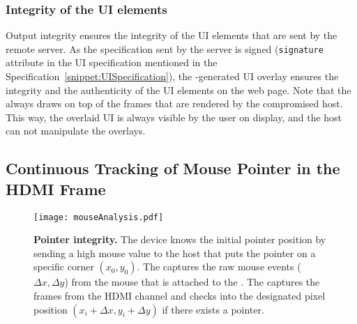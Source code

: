\subsubsection{\bfseries Integrity of the UI elements} Output integrity ensures the integrity of the UI elements that are sent by the remote server. As the specification sent by the server is signed (\texttt{signature} attribute in the UI specification mentioned in the Specification~\ref{snippet:UISpecification}), the \device-generated UI overlay ensures the integrity and the authenticity of the UI elements on the web page. Note that the \device always draws on top of the frames that are rendered by the compromised host. This way, the overlaid UI is always visible by the user on display, and the host can not manipulate the overlays.



\subsection{Continuous Tracking of Mouse Pointer in the HDMI Frame}
\label{sec:systemDesign:analysis}


\begin{figure}[t]
\centering
\texttt{[image: mouseAnalysis.pdf]}
\caption{\textbf{Pointer integrity.} The device knows the initial pointer position by sending a high mouse value to the host that puts the pointer on a specific corner $(x_0, y_0)$. \one The \device captures the raw mouse events ($\Delta x, \Delta y$) from the mouse that is attached to the \device. \two The \device captures the frames from the HDMI channel and checks into the designated pixel position $(x_i + \Delta x, y_i + \Delta y)$ if there exists a pointer.}
\spacesave
\label{fig:mouseAnalysis}
\centering
\end{figure}

